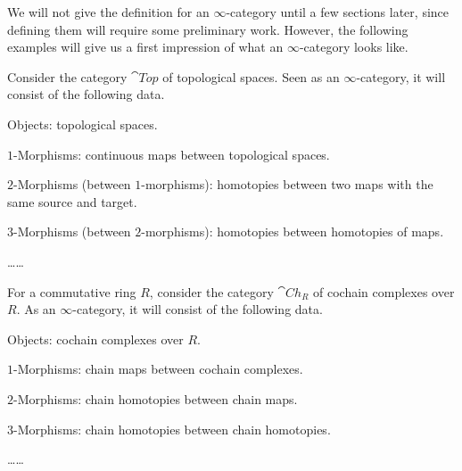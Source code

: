 We will not give the definition for an $\infty$-category
until a few sections later, since defining them will require some preliminary work.
However, the following examples will give us 
a first impression of what an $\infty$-category looks like.

\begin{example} \label{eg-1-top}
    Consider the category $\cat{Top}$ of topological spaces.
    Seen as an $\infty$-category, it will consist of the following data.
    \begin{samepage}
        \begin{itms}
            \item Objects: topological spaces.
            \item $1$-Morphisms: continuous maps between topological spaces.
            \item $2$-Morphisms (between $1$-morphisms): homotopies between two maps
            with the same source and target.
            \item $3$-Morphisms (between $2$-morphisms): homotopies between homotopies of maps. \nopagebreak
            \item \dots\dots \varqed
        \end{itms}
    \end{samepage}
\end{example}

\begin{example}
    For a commutative ring $R$, consider the category $\cat{Ch}_R$ of cochain complexes over $R$.
    As an $\infty$-category, it will consist of the following data.
    \begin{itms}
        \item Objects: cochain complexes over $R$.
        \item $1$-Morphisms: chain maps between cochain complexes.
        \item $2$-Morphisms: chain homotopies between chain maps.
        \item $3$-Morphisms: chain homotopies between chain homotopies.
        \item \dots\dots \varqed
    \end{itms}
\end{example}

